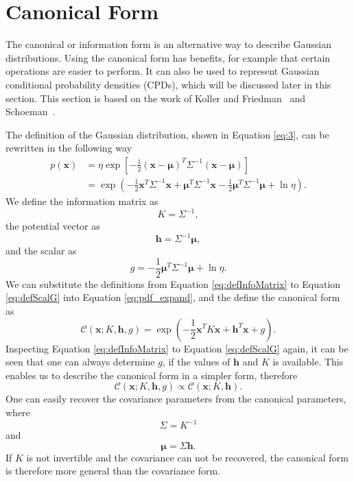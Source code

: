 \documentclass[12pt,oneside,openany,a4paper, %
afrikaans,english,
]{memoir}
\numberwithin{equation}{chapter}
\begin{document}
\section{Canonical Form}\label{sec:canonical}
The canonical or information form is an alternative way to describe Gaussian distributions. Using the canonical form has benefits, for example that certain operations are easier to perform. It can also be used to represent Gaussian conditional probability densities (CPDs), which will be discussed later in this section. This section is based on the work of Koller and Friedman~\cite{koller} and Schoeman~\citep{JC}.

The definition of the Gaussian distribution, shown in Equation \ref{eq:3}, can be rewritten in the following way
\begin{equation}
\begin{split}\label{eq:pdf_expand}
p(\bm{x}) & = \eta\exp\left[-\frac{1}{2}(\bm{x}-\bm{\mu})^T\Sigma^{-1}(\bm{x}-\bm{\mu})\right]\\
& = \exp\left(-\frac{1}{2}\bm{x}^T\Sigma^{-1}\bm{x} + \bm{\mu}^T\Sigma^{-1}\bm{x} - \frac{1}{2}\bm{\mu}^T\Sigma^{-1}\bm{\mu} + \ln{\eta}\right).
\end{split}
\end{equation}
We define the information matrix as
\begin{equation}\label{eq:defInfoMatrix}
K = \Sigma^{-1},
\end{equation}
the potential vector as
\begin{equation}\label{eq:defPotVec}
\bm{h} = \Sigma^{-1}\bm{\mu},
\end{equation}
and the scalar as
\begin{equation}\label{eq:defScalG}
g = - \frac{1}{2}\bm{\mu}^T\Sigma^{-1}\bm{\mu} + \ln{\eta}.
\end{equation}
We can substitute the definitions from Equation \ref{eq:defInfoMatrix} to Equation \ref{eq:defScalG} into Equation \ref{eq:pdf_expand}, and the define the canonical form as
\begin{equation}\label{eq:defCanonical}
\mathcal{C}(\bm{x}; K,\bm{h},g) = \exp\left(-\frac{1}{2}\bm{x}^TK\bm{x} + \bm{h}^T\bm{x} +g \right).
\end{equation}
Inspecting Equation \ref{eq:defInfoMatrix} to Equation \ref{eq:defScalG} again, it can be seen that one can always determine $g$, if the values of $\bm{h}$ and $K$ is available. This enables us to describe the canonical form in a simpler form, therefore
\begin{equation}
\mathcal{C}(\bm{x}; K,\bm{h},g) \propto \mathcal{C}(\bm{x}; K,\bm{h}).
\end{equation}
One can easily recover the covariance parameters from the canonical parameters, where
\begin{equation}
\Sigma = K^{-1}
\end{equation}
and
\begin{equation}
\bm{\mu} = \Sigma\bm{h}.
\end{equation}
If $K$ is not invertible and the covariance can not be recovered, the canonical form is therefore more general than the covariance form.
\end{document}
